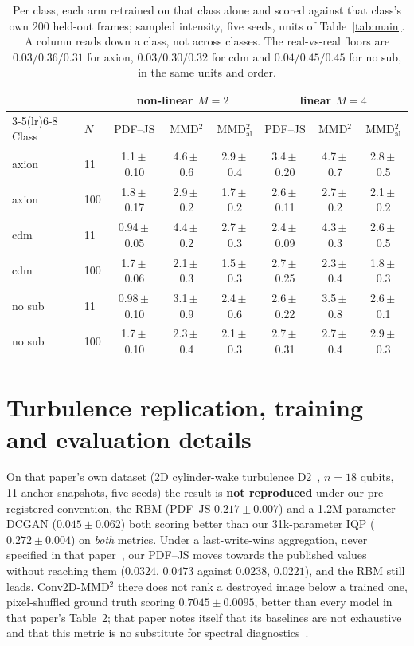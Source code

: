 \documentclass{article}
\begin{document}
\begin{table}[tb]
\centering
\caption{Per class, each arm retrained on that class alone and scored against that class's own $200$
held-out frames; sampled intensity, five seeds, units of Table~\ref{tab:main}. A column reads down a
class, not across classes. The real-vs-real floors are $0.03 / 0.36 / 0.31$ for axion,
$0.03 / 0.30 / 0.32$ for cdm and $0.04 / 0.45 / 0.45$ for no sub, in the same units and order.}
\label{tab:perclass}
\scriptsize
\setlength{\tabcolsep}{3pt}
\begin{tabular}{llcccccc}
\toprule
& & \multicolumn{3}{c}{non-linear $M{=}2$} & \multicolumn{3}{c}{linear $M{=}4$} \\
\cmidrule(lr){3-5}\cmidrule(lr){6-8}
Class & $N$ & PDF--JS & MMD$^2$ & MMD$^2_{\mathrm{al}}$ & PDF--JS & MMD$^2$ & MMD$^2_{\mathrm{al}}$ \\
\midrule
axion  & 11  & 1.1\,$\pm$\,0.10 & 4.6\,$\pm$\,0.6 & 2.9\,$\pm$\,0.4 & 3.4\,$\pm$\,0.20 & 4.7\,$\pm$\,0.7 & 2.8\,$\pm$\,0.5 \\
axion  & 100 & 1.8\,$\pm$\,0.17 & 2.9\,$\pm$\,0.2 & 1.7\,$\pm$\,0.2 & 2.6\,$\pm$\,0.11 & 2.7\,$\pm$\,0.2 & 2.1\,$\pm$\,0.2 \\
cdm    & 11  & 0.94\,$\pm$\,0.05 & 4.4\,$\pm$\,0.2 & 2.7\,$\pm$\,0.3 & 2.4\,$\pm$\,0.09 & 4.3\,$\pm$\,0.3 & 2.6\,$\pm$\,0.5 \\
cdm    & 100 & 1.7\,$\pm$\,0.06 & 2.1\,$\pm$\,0.3 & 1.5\,$\pm$\,0.3 & 2.7\,$\pm$\,0.25 & 2.3\,$\pm$\,0.4 & 1.8\,$\pm$\,0.3 \\
no sub & 11  & 0.98\,$\pm$\,0.10 & 3.1\,$\pm$\,0.9 & 2.4\,$\pm$\,0.6 & 2.6\,$\pm$\,0.22 & 3.5\,$\pm$\,0.8 & 2.6\,$\pm$\,0.1 \\
no sub & 100 & 1.7\,$\pm$\,0.10 & 2.3\,$\pm$\,0.4 & 2.1\,$\pm$\,0.3 & 2.7\,$\pm$\,0.31 & 2.7\,$\pm$\,0.4 & 2.9\,$\pm$\,0.3 \\
\bottomrule
\end{tabular}
\end{table}

\section{Turbulence replication, training and evaluation details}
\label{app:turb}

On that paper's own dataset (2D cylinder-wake turbulence D2~\cite{khojasteh_2022_lagrangian},
$n=18$ qubits, 11 anchor snapshots, five seeds) the result is \textbf{not reproduced} under our
pre-registered convention, the RBM (PDF--JS $0.217 \pm 0.007$) and a 1.2M-parameter DCGAN
($0.045 \pm 0.062$) both scoring better than our 31k-parameter IQP ($0.272 \pm 0.004$) on
\emph{both} metrics. Under a last-write-wins aggregation, never specified in that
paper~\cite{liu_2026_correlation}, our PDF--JS moves towards the published values without
reaching them ($0.0324$, $0.0473$ against $0.0238$, $0.0221$), and the RBM still leads.
Conv2D-MMD$^2$ there does not rank a destroyed image below a trained one, pixel-shuffled ground truth
scoring $0.7045 \pm 0.0095$, better than every model in that paper's Table~2; that paper notes itself
that its baselines are not exhaustive and that this metric is no substitute for spectral
diagnostics~\cite{liu_2026_correlation}.
\end{document}
